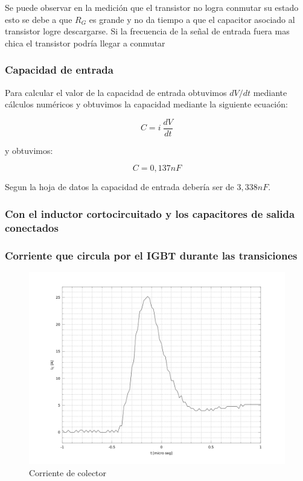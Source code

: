 \documentclass[a4paper,10pt]{article}
\begin{document}
Se puede observar en la medición que el transistor no logra conmutar su estado esto se debe a que $R_{G}$ es grande y no da tiempo a que el  capacitor asociado al transistor logre descargarse. Si la frecuencia de la señal de entrada fuera mas chica el transistor podría llegar a conmutar 

\subsubsection{Capacidad de entrada}

Para calcular el valor de la capacidad de entrada obtuvimos $dV/dt$ mediante cálculos numéricos y obtuvimos la capacidad mediante la siguiente ecuación:

\begin{equation}
C = i\ \frac{dV}{dt}
\end{equation}

y obtuvimos:

\begin{equation}
C = 0,137 \unit{nF}
\end{equation}

Segun la hoja de datos la capacidad de entrada debería ser de $3,338 \unit{nF}$.

\subsubsection{Con el inductor cortocircuitado y los capacitores de salida conectados}

\subsubsection*{Corriente que circula por el IGBT durante las transiciones}

\begin{figure}[H] %
\begin{center}
\includegraphics[scale=0.2]{./imagenes/Ic1.png}
\caption{Corriente de colector}
 \label{fig:Ic1}
\end{center}
\end{figure}
\end{document}
